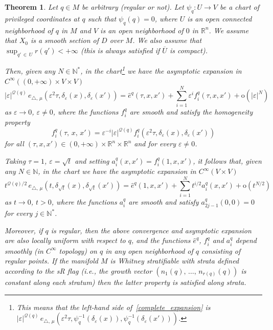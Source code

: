 \documentclass[AHL,Unicode,published]{cedram}
\newcommand*\R{\mathbb{R}}
\newcommand*\N{\mathbb{N}}
\newcommand{\calQ}{\mathcal{Q}}
\newcommand{\rmo}{\mathrm{o}}
\newtheorem{theol}{Theorem}
\begin{document}
\begin{theol}\label{main_thm}
Let $q\in M$ be arbitrary (regular or not). Let $\psi_{q}:U\rightarrow V$ be a chart of privileged coordinates at $q$ such that $\psi_{q}(q)=0$, where $U$ is an open connected neighborhood of $q$ in $M$ and $V$ is an open neighborhood of $0$ in $\R^n$. We assume that $X_0$ is a smooth section of $D$ over $M$. We also assume that $\sup_{q'\,\in\,U} r(q')<+\infty$ (this is always satisfied if $\overline U$ is compact).

Then, given any $N\in\N^*$, in the chart\footnote{This means that the left-hand side of~\eqref{complete_expansion} is $\vert\varepsilon\vert^{\calQ(q)}\, e_{\triangle,\,\mu}(\varepsilon^2 \tau,\psi_{q}^{-1}(\delta_\varepsilon(x)),\psi_{q}^{-1}(\delta_\varepsilon(x')))$.} we have the asymptotic expansion in $C^\infty((0,+\infty)\times V\times V)$
\begin{equation}\label{complete_expansion}
\vert\varepsilon\vert^{\calQ(q)}\, e_{\triangle,\,\mu}\left(\varepsilon^2 \tau,\delta_\varepsilon(x),\delta_\varepsilon(x')\right) = \widehat{e}^{q}(\tau,x,x') + \sum_{i=1}^N \varepsilon^i f^{q}_i(\tau,x,x') + \rmo\left(\vert\varepsilon\vert^N\right)
\end{equation}
as $\varepsilon\rightarrow 0$, $\varepsilon\neq 0$, where the functions $f^{q}_i$ are smooth and satisfy the homogeneity property
\[
f^{q}_i(\tau,\,x,\,x') = \varepsilon^{-i} \vert\varepsilon\vert^{\calQ(q)} f^{q}_i\left(\varepsilon^2 \tau,\delta_\varepsilon(x),\delta_\varepsilon(x')\right)
\]
for all $(\tau,x,x')\in(0,+\infty)\times\R^n\times\R^n$ and for every $\varepsilon\neq 0$.

Taking $\tau=1$, $\varepsilon=\sqrt{t}$ and setting $a_i^{q}(x,x')=f^{q}_i(1,x,x')$, it follows that, given any $N\in\N$, in the chart we have the asymptotic expansion in $C^\infty(V\times V)$
\begin{equation}\label{complete_expansion_1}
t^{\calQ(q)/2}\, e_{\triangle,\,\mu}\left(t,\delta_{\sqrt{t}}(x),\delta_{\sqrt{t}}(x')\right) = \widehat{e}^{q}(1,x,x') + \sum_{i=1}^N t^{i/2} a_i^{q}(x,x') + \rmo\left(t^{N/2}\right)
\end{equation}
as $t\rightarrow 0$, $t>0$, where the functions $a_i^{q}$ are smooth and satisfy $a_{2j-1}^{q}(0,0)=0$ for every $j\in\N^*$.

Moreover, if $q$ is regular, then the above convergence and asymptotic expansion are also locally uniform with respect to $q$, and the functions $\widehat{e}^{q}$, $f^{q}_i$ and $a_i^{q}$ depend smoothly (in $C^\infty$ topology) on $q$ in any open neighborhood of $q$ consisting of regular points. If the manifold $M$ is Whitney stratifiable with strata defined according to the sR flag (i.e., the growth vector $(n_1(q),\,\ldots,\,n_{r(q)}(q))$ is constant along each stratum) then the latter property is satisfied along strata. 
\end{theol}
\end{document}
